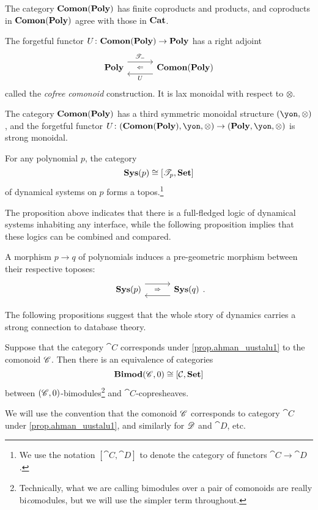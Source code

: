 \documentclass[Book-Poly]{subfiles}
\begin{document}
\begin{proposition}
The category $\mathbf{Comon}(\mathbf{Poly})$ has finite coproducts and products, and coproducts in $\mathbf{Comon}(\mathbf{Poly})$ agree with those in $\mathbf{Cat}$.
\end{proposition}

\begin{proposition}
The forgetful functor $U\colon\mathbf{Comon}(\mathbf{Poly})\to\mathbf{Poly}$ has a right adjoint
\[
\adjr{\poly}{\cofree{-}}{U}{\comon}
\]
called the \emph{cofree comonoid} construction. It is lax monoidal with respect to $\otimes$.
\end{proposition}

\begin{proposition}
The category $\mathbf{Comon}(\mathbf{Poly})$ has a third symmetric monoidal structure $(\yon,\otimes)$, and the forgetful functor $U\colon(\comon,\yon,\otimes)\to(\poly,\yon,\otimes)$ is strong monoidal.
\end{proposition}

\begin{proposition}\label{prop.sysp[i]s_topos}
For any polynomial $p$, the category
\[\mathbf{Sys}(p)\cong[\mathscr{T}_{p},\mathbf{Set}]\]
of dynamical systems on $p$ forms a topos.\footnote{We use the notation $[\cat{C}, \cat{D}]$ to denote the category of functors $\cat{C}\to\cat{D}$.}
\end{proposition}

The proposition above indicates that there is a full-fledged logic of dynamical systems inhabiting any interface, while the following proposition implies that these logics can be combined and compared.

\begin{proposition}\label{prop.poly_map_pregeo_topos}
A morphism $p\to q$ of polynomials induces a pre-geometric morphism between their respective toposes:
\[
\adj{\sys(p)}{}{}{\sys(q)}.
\]
\end{proposition}

The following propositions suggest that the whole story of dynamics carries a strong connection to database theory.

\begin{proposition}
Suppose that the category $\cat{C}$ corresponds under \cref{prop.ahman_uustalu1} to the comonoid $\mathscr{C}$. Then there is an equivalence of categories
\[
\mathbf{Bimod}(\mathscr{C},0)\cong[\mathcal{C},\mathbf{Set}]
\]
between $(\mathscr{C},0)$-bimodules\footnote{Technically, what we are calling bimodules over a pair of comonoids are really bi\emph{co}modules, but we will use the simpler term throughout.} and $\cat{C}$-copresheaves.
\end{proposition}
We will use the convention that the comonoid $\mathscr{C}$ corresponds to category $\cat{C}$ under \cref{prop.ahman_uustalu1}, and similarly for $\mathscr{D}$ and $\cat{D}$, etc. 
\end{document}
